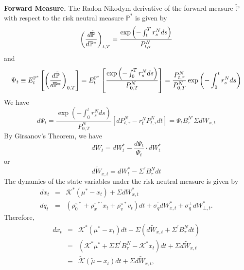 \documentclass{article}
\begin{document}
\textbf{Forward Measure.} The Radon-Nikodym derivative of the forward
measure $\mathbb{\tilde{P}}$ with respect to the risk neutral measure $%
\mathbb{P}^{\ast }$ is given by%
\begin{equation}
\left( \frac{d\mathbb{\tilde{P}}}{d\mathbb{P}^{\ast }}\right) _{t,T}=\frac{%
\exp \left( -\int_{t}^{T}r_{s}^{N}ds\right) }{P_{t,\tau }^{N}}
\end{equation}%
and%
\begin{equation*}
\Psi _{t}\equiv E_{t}^{\mathbb{P}^{\ast }}\left[ \left( \frac{d\mathbb{%
\tilde{P}}}{d\mathbb{P}^{\ast }}\right) _{0,T}\right] =E_{t}^{\mathbb{P}%
^{\ast }}\left[ \frac{\exp \left( -\int_{0}^{T}r_{s}^{N}ds\right) }{%
P_{0,T}^{N}}\right] =\frac{P_{t,\tau }^{N}}{P_{0,T}^{N}}\exp \left(
-\int_{0}^{t}r_{s}^{N}ds\right) 
\end{equation*}%
We have%
\begin{equation*}
d\Psi _{t}=\frac{\exp \left( -\int_{0}^{t}r_{s}^{N}ds\right) }{P_{0,T}^{N}}%
\left[ dP_{t,\tau }^{N}-r_{t}^{N}P_{t,\tau }^{N}dt\right] =\Psi _{t}B_{\tau
}^{N\prime }\Sigma dW_{x,t}
\end{equation*}%
By Girsanov's Theorem, we have%
\begin{equation*}
d\tilde{W}_{t}=dW_{t}^{\ast }-\frac{d\Psi _{t}}{\Psi _{t}}\cdot dW_{t}^{\ast
}
\end{equation*}%
or%
\begin{equation*}
d\tilde{W}_{x,t}=dW_{t}^{\ast }-\Sigma ^{\prime }B_{\tau }^{N}dt
\end{equation*}%
The dynamics of the state variables under the risk neutral measure is given
by%
\begin{eqnarray*}
dx_{t} &=&\mathcal{K}^{\ast }\left( \mu ^{\ast }-x_{t}\right) +\Sigma
dW_{x,t}^{\ast } \\
dq_{t} &=&\left( \rho _{0}^{\pi \ast }+\rho _{x}^{\pi \ast \prime
}x_{t}+\rho _{v}^{\pi \ast }v_{t}\right) dt+\sigma _{q}^{\prime
}dW_{x,t}^{\ast }+\sigma _{q}^{\bot }dW_{\bot ,t}^{\ast }.
\end{eqnarray*}%
Therefore,%
\begin{eqnarray*}
dx_{t} &=&\mathcal{K}^{\ast }\left( \mu ^{\ast }-x_{t}\right) dt+\Sigma
\left( d\tilde{W}_{x,t}+\Sigma ^{\prime }B_{\tau }^{N}dt\right)  \\
&=&\left( \mathcal{K}^{\ast }\mu ^{\ast }+\Sigma \Sigma ^{\prime }B_{\tau
}^{N}-\mathcal{K}^{\ast }x_{t}\right) dt+\Sigma d\tilde{W}_{x,t} \\
&\equiv &\mathcal{\tilde{K}}\left( \tilde{\mu}-x_{t}\right) dt+\Sigma d%
\tilde{W}_{x,t},
\end{eqnarray*}%
\end{document}
